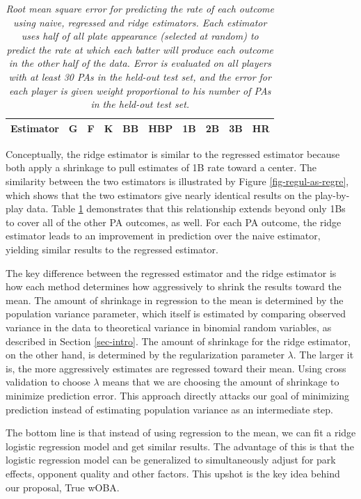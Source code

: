 \documentclass[11pt]{article}
\begin{document}
\begin{table}[h]
\centering
\caption{\it Root mean square error for predicting the rate of each outcome
    using naive, regressed and ridge estimators. Each estimator uses half of
    all plate appearance (selected at random) to predict the rate at which each
    batter will produce each outcome in the other half of the data. Error is
    evaluated on all players with at least 30 PAs in the held-out test set, and
    the error for each player is given weight proportional to his number of PAs
    in the held-out test set.}
\begin{tabular}{c|ccccccccc}
Estimator & G & F & K & BB & HBP & 1B & 2B & 3B & HR\\
\hline

\end{tabular}
\label{tab-regul-as-regre}
\end{table}

Conceptually, the ridge estimator is similar to the regressed estimator because
both apply a shrinkage to pull estimates of 1B rate toward a center. The
similarity between the two estimators is illustrated by Figure
\ref{fig-regul-as-regre}, which shows that the two estimators give nearly
identical results on the play-by-play data. Table \ref{tab-regul-as-regre}
demonstrates that this relationship extends beyond only 1Bs to cover all of the
other PA outcomes, as well. For each PA outcome, the ridge estimator leads to
an improvement in prediction over the naive estimator, yielding similar results
to the regressed estimator.

The key difference between the regressed estimator and the ridge estimator is
how each method determines how aggressively to shrink the results toward the
mean. The amount of shrinkage in regression to the mean is determined by the
population variance parameter, which itself is estimated by comparing observed
variance in the data to theoretical variance in binomial random variables, as
described in Section \ref{sec-intro}. The amount of shrinkage for the ridge
estimator, on the other hand, is determined by the regularization parameter
$\lambda$. The larger it is, the more aggressively estimates are regressed
toward their mean. Using cross validation to choose $\lambda$ means that we
are choosing the amount of shrinkage to minimize prediction error. This
approach directly attacks our goal of minimizing prediction instead of
estimating population variance as an intermediate step.

The bottom line is that instead of using regression to the mean, we can fit a
ridge logistic regression model and get similar
results. The advantage of this is that the logistic regression model can be
generalized to simultaneously adjust for park effects, opponent quality and
other factors. This upshot is the key idea behind our proposal, True wOBA.
\end{document}
